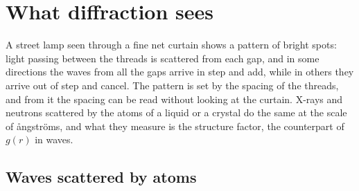 \section{What diffraction sees}
\label{sec:ob-sq}

A street lamp seen through a fine net curtain shows a pattern of bright
spots: light passing between the threads is scattered from each gap, and
in some directions the waves from all the gaps arrive in step and add,
while in others they arrive out of step and cancel. The pattern is set by
the spacing of the threads, and from it the spacing can be read without
looking at the curtain. X-rays and neutrons scattered by the atoms of a
liquid or a crystal do the same at the scale of ångströms, and what they
measure is the structure factor, the counterpart of $g(r)$ in waves.

\subsection*{Waves scattered by atoms}

